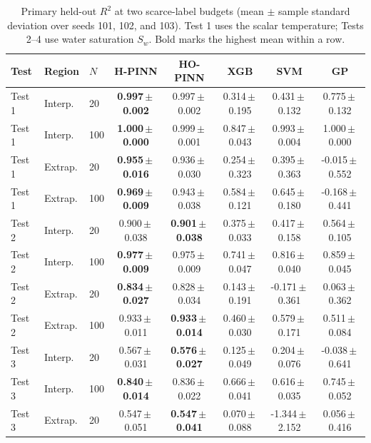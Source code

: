 \begin{table}
\centering
\small
\setlength{\tabcolsep}{3.5pt}
\caption{Primary held-out $R^2$ at two scarce-label budgets (mean $\pm$ sample standard deviation over seeds 101, 102, and 103). Test 1 uses the scalar temperature; Tests 2--4 use water saturation $S_w$. Bold marks the highest mean within a row.}
\label{tab:primary_r2}
\begin{tabular}{lllccccc}
\toprule
Test & Region & $N$ & H-PINN & HO-PINN & XGB & SVM & GP \\
\midrule
Test 1 & Interp. & 20 & \textbf{0.997\,$\pm$\,0.002} & 0.997\,$\pm$\,0.002 & 0.314\,$\pm$\,0.195 & 0.431\,$\pm$\,0.132 & 0.775\,$\pm$\,0.132 \\
Test 1 & Interp. & 100 & \textbf{1.000\,$\pm$\,0.000} & 0.999\,$\pm$\,0.001 & 0.847\,$\pm$\,0.043 & 0.993\,$\pm$\,0.004 & 1.000\,$\pm$\,0.000 \\
Test 1 & Extrap. & 20 & \textbf{0.955\,$\pm$\,0.016} & 0.936\,$\pm$\,0.030 & 0.254\,$\pm$\,0.323 & 0.395\,$\pm$\,0.363 & -0.015\,$\pm$\,0.552 \\
Test 1 & Extrap. & 100 & \textbf{0.969\,$\pm$\,0.009} & 0.943\,$\pm$\,0.038 & 0.584\,$\pm$\,0.121 & 0.645\,$\pm$\,0.180 & -0.168\,$\pm$\,0.441 \\
\midrule
Test 2 & Interp. & 20 & 0.900\,$\pm$\,0.038 & \textbf{0.901\,$\pm$\,0.038} & 0.375\,$\pm$\,0.033 & 0.417\,$\pm$\,0.158 & 0.564\,$\pm$\,0.105 \\
Test 2 & Interp. & 100 & \textbf{0.977\,$\pm$\,0.009} & 0.975\,$\pm$\,0.009 & 0.741\,$\pm$\,0.047 & 0.816\,$\pm$\,0.040 & 0.859\,$\pm$\,0.045 \\
Test 2 & Extrap. & 20 & \textbf{0.834\,$\pm$\,0.027} & 0.828\,$\pm$\,0.034 & 0.143\,$\pm$\,0.191 & -0.171\,$\pm$\,0.361 & 0.063\,$\pm$\,0.362 \\
Test 2 & Extrap. & 100 & 0.933\,$\pm$\,0.011 & \textbf{0.933\,$\pm$\,0.014} & 0.460\,$\pm$\,0.030 & 0.579\,$\pm$\,0.171 & 0.511\,$\pm$\,0.084 \\
\midrule
Test 3 & Interp. & 20 & 0.567\,$\pm$\,0.031 & \textbf{0.576\,$\pm$\,0.027} & 0.125\,$\pm$\,0.049 & 0.204\,$\pm$\,0.076 & -0.038\,$\pm$\,0.641 \\
Test 3 & Interp. & 100 & \textbf{0.840\,$\pm$\,0.014} & 0.836\,$\pm$\,0.022 & 0.666\,$\pm$\,0.041 & 0.616\,$\pm$\,0.035 & 0.745\,$\pm$\,0.052 \\
Test 3 & Extrap. & 20 & 0.547\,$\pm$\,0.051 & \textbf{0.547\,$\pm$\,0.041} & 0.070\,$\pm$\,0.088 & -1.344\,$\pm$\,2.152 & 0.056\,$\pm$\,0.416 \\

\end{tabular}
\end{table}
